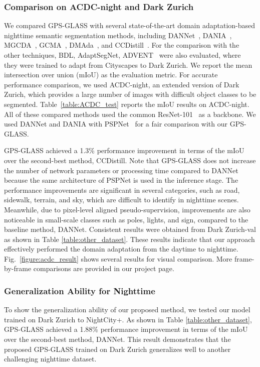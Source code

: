 \documentclass[10pt,twocolumn,letterpaper]{article}
\begin{document}
\subsubsection{Comparison on ACDC-night and Dark Zurich}
We compared GPS-GLASS with several state-of-the-art domain adaptation-based nighttime semantic segmentation methods, including DANNet~\cite{wu2021dannet}, DANIA~\cite{wu2021dania}, MGCDA~\cite{sakaridis2020map-guided}, GCMA~\cite{sakaridis2019guided}, DMAda~\cite{dai2018DMAda}, and CCDistill~\cite{gao2022ccdistill}. For the comparison with the other techniques, BDL, AdaptSegNet, ADVENT~\cite{tsai2018adaptseg,vu2019advent,li2019bidirectional} were also evaluated, where they were trained to adapt from Cityscapes to Dark Zurich. We report the mean intersection over union (mIoU) as the evaluation metric. For accurate performance comparison, we used ACDC-night, an extended version of Dark Zurich, which provides a large number of images with difficult object classes to be segmented. Table~\ref{table:ACDC_test} reports the mIoU results on ACDC-night. All of these compared methods used the common ResNet-101~\cite{he2016resnet101} as a backbone. We used DANNet and DANIA with PSPNet~\cite{zhao2017pyramid} for a fair comparison with our GPS-GLASS. 

GPS-GLASS achieved a 1.3\% performance improvement in terms of the mIoU over the second-best method, CCDistill. Note that GPS-GLASS does not increase the number of network parameters or processing time compared to DANNet because the same architecture of PSPNet is used in the inference stage. The performance improvements are significant in several categories, such as road, sidewalk, terrain, and sky, which are difficult to identify in nighttime scenes. Meanwhile, due to pixel-level aligned pseudo-supervision, improvements are also noticeable in small-scale classes such as poles, lights, and sign, compared to the baseline method, DANNet. Consistent results were obtained from Dark Zurich-val as shown in Table \ref{table:other_dataset}. These results indicate that our approach effectively performed the domain adaptation from the daytime to nighttime. Fig.~\ref{figure:acdc_result} shows several results for visual comparison. More frame-by-frame comparisons are provided in our project page.

\subsubsection{Generalization Ability for Nighttime}
To show the generalization ability of our proposed method, we tested our model trained on Dark Zurich to NightCity+. As shown in Table \ref{table:other_dataset}, GPS-GLASS achieved a 1.88\% performance improvement in terms of the mIoU over the second-best method, DANNet. This result demonstrates that the proposed GPS-GLASS trained on Dark Zurich generalizes well to another challenging nighttime dataset. 
\end{document}
